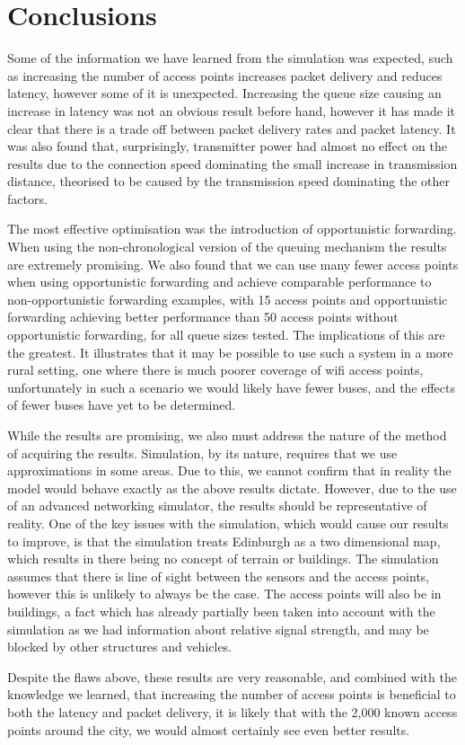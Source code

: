     \section{Conclusions}\label{data_gathering_performance_conclusions}


        Some of the information we have learned from the simulation was expected, such as increasing the number of access points increases packet delivery and reduces latency, however some of it is unexpected. Increasing the queue size causing an increase in latency was not an obvious result before hand, however it has made it clear that there is a trade off between packet delivery rates and packet latency. It was also found that, surprisingly, transmitter power had almost no effect on the results due to the connection speed dominating the small increase in transmission distance, theorised to be caused by the transmission speed dominating the other factors.

        The most effective optimisation was the introduction of opportunistic forwarding. When using the non-chronological version of the queuing mechanism the results are extremely promising. We also found that we can use many fewer access points when using opportunistic forwarding and achieve comparable performance to non-opportunistic forwarding examples, with 15 access points and opportunistic forwarding achieving better performance than 50 access points without opportunistic forwarding, for all queue sizes tested. The implications of this are the greatest. It illustrates that it may be possible to use such a system in a more rural setting, one where there is much poorer coverage of wifi access points, unfortunately in such a scenario we would likely have fewer buses, and the effects of fewer buses have yet to be determined. 

        While the results are promising, we also must address the nature of the method of acquiring the results. Simulation, by its nature, requires that we use approximations in some areas. Due to this, we cannot confirm that in reality the model would behave exactly as the above results dictate. However, due to the use of an advanced networking simulator, the results should be representative of reality. One of the key issues with the simulation, which would cause our results to improve, is that the simulation treats Edinburgh as a two dimensional map, which results in there being no concept of terrain or buildings. The simulation assumes that there is line of sight between the sensors and the access points, however this is unlikely to always be the case. The access points will also be in buildings, a fact which has already partially been taken into account with the simulation as we had information about relative signal strength, and may be blocked by other structures and vehicles. 

        Despite the flaws above, these results are very reasonable, and combined with the knowledge we learned, that increasing the number of access points is beneficial to both the latency and packet delivery, it is likely that with the 2,000 known access points around the city, we would almost certainly see even better results.

